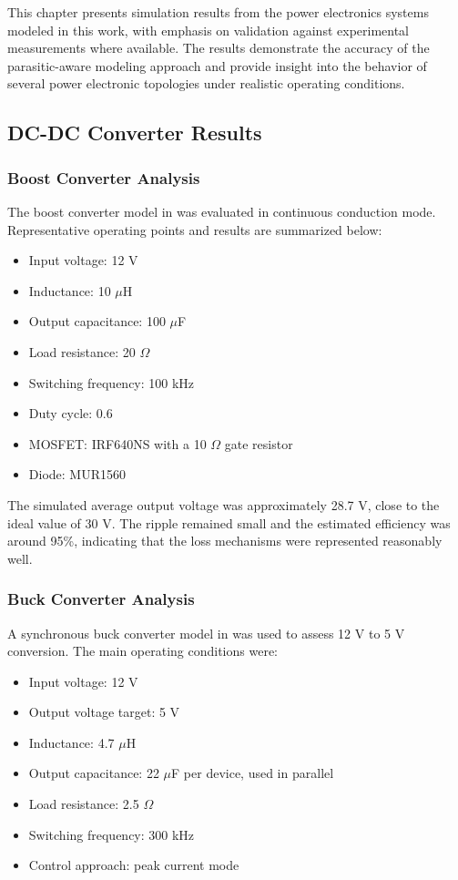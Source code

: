 This chapter presents simulation results from the power electronics systems modeled in this work, with emphasis on validation against experimental measurements where available. The results demonstrate the accuracy of the parasitic-aware modeling approach and provide insight into the behavior of several power electronic topologies under realistic operating conditions.

\subsection{DC-DC Converter Results}
\subsubsection{Boost Converter Analysis}
The boost converter model in  was evaluated in continuous conduction mode. Representative operating points and results are summarized below:
\begin{itemize}
    \item Input voltage: 12 V
    \item Inductance: 10 $\mu$H
    \item Output capacitance: 100 $\mu$F
    \item Load resistance: 20 $\Omega$
    \item Switching frequency: 100 kHz
    \item Duty cycle: 0.6
    \item MOSFET: IRF640NS with a 10 $\Omega$ gate resistor
    \item Diode: MUR1560
\end{itemize}

The simulated average output voltage was approximately 28.7 V, close to the ideal value of 30 V. The ripple remained small and the estimated efficiency was around 95\%, indicating that the loss mechanisms were represented reasonably well.

\subsubsection{Buck Converter Analysis}
A synchronous buck converter model in  was used to assess 12 V to 5 V conversion. The main operating conditions were:
\begin{itemize}
    \item Input voltage: 12 V
    \item Output voltage target: 5 V
    \item Inductance: 4.7 $\mu$H
    \item Output capacitance: 22 $\mu$F per device, used in parallel
    \item Load resistance: 2.5 $\Omega$
    \item Switching frequency: 300 kHz
    \item Control approach: peak current mode
\end{itemize}

